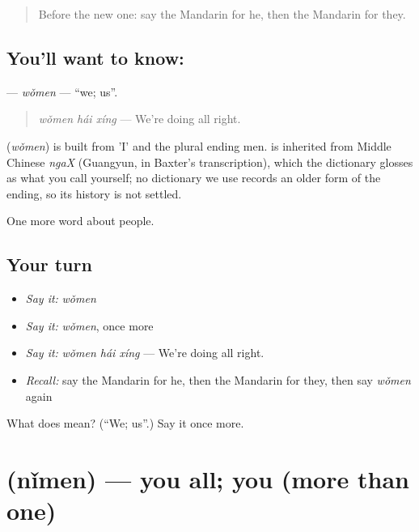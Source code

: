 \label{lesson:ZH-C31-women}



\begin{quote}
Before the new one: say the Mandarin for he, then the Mandarin for they.
\end{quote}

\subsection*{You'll want to know: }
\textbf{} — \emph{wǒmen} — \textquotedblleft{}we; us\textquotedblright{}.

\begin{quote}
\emph{wǒmen hái xíng} — We're doing all right.
\end{quote}

\begin{cousinweb}
\textbf{} (\emph{wǒmen}) is built from  'I' and the plural ending men.  is inherited from Middle Chinese \emph{ngaX} (Guangyun, in Baxter's transcription), which the dictionary glosses as what you call yourself; no dictionary we use records an older form of the ending, so its history is not settled.
\end{cousinweb}

\begin{grammarlens}[title={What you've built}]
One more word about people.
\end{grammarlens}

\subsection*{Your turn}
\begin{itemize}
\raggedright
  \item \emph{Say it:} \emph{wǒmen}
  \item \emph{Say it:} \emph{wǒmen}, once more
  \item \emph{Say it:} \emph{wǒmen hái xíng} — We're doing all right.
  \item \emph{Recall:} say the Mandarin for he, then the Mandarin for they, then say \emph{wǒmen} again
\end{itemize}

\begin{tcolorbox}[breakable,colback=teal!4,colframe=teal!35!black,title={Before you move on}]
What does  mean? (\textquotedblleft{}We; us\textquotedblright{}.) Say it once more.
\end{tcolorbox}
\section[\texorpdfstring{\zh{你们} (nǐmen)}{你们 (nǐmen)}]{ (nǐmen) — you all; you (more than one)}


